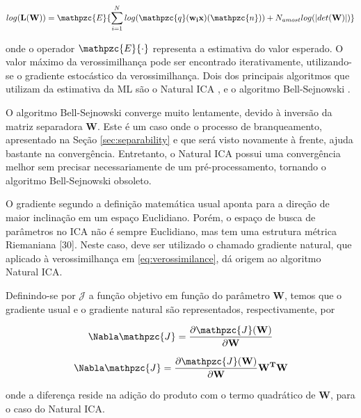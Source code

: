         \begin{equation}
        \label{eq:logverossimilance}
        log(\mathbf{L(W)}) = \mathpzc{E}\{\sum_{i=1}^Nlog(\mathpzc{q}(\mathbf{w_ix})(\mathpzc{n})) + N_{amost}log(|det(\mathbf{W})|)\}
    \end{equation}
    
    onde o operador $\mathpzc{E}\{\cdot\}$ representa a estimativa do valor esperado. O valor máximo da verossimilhança pode ser encontrado iterativamente, utilizando-se o gradiente estocástico da verossimilhança. Dois dos principais algoritmos que utilizam da estimativa da ML são o Natural ICA \cite{NaturalICA}, e o algoritmo Bell-Sejnowski \cite{Bell}.
    
    O algoritmo Bell-Sejnowski converge muito lentamente, devido à inversão da matriz separadora $\mathbf{W}$. Este é um caso onde o processo de branqueamento, apresentado na Seção \ref{sec:separability} e que será visto novamente à frente, ajuda bastante na convergência. Entretanto, o Natural ICA possui uma convergência melhor sem precisar necessariamente de um pré-processamento, tornando o algoritmo Bell-Sejnowski obsoleto.
    
    O gradiente segundo a definição matemática usual aponta para a direção de maior inclinação em um espaço Euclidiano. Porém, o espaço de busca de parâmetros no ICA não é sempre Euclidiano, mas tem uma estrutura métrica Riemaniana [30]. Neste caso, deve ser utilizado o chamado gradiente natural, que aplicado à verossimilhança em \ref{eq:verossimilance}, dá origem ao algoritmo Natural ICA.
    
    Definindo-se por $\mathcal{J}$ a função objetivo em função do parâmetro $\mathbf{W}$, temos que o gradiente usual e o gradiente natural são representados, respectivamente, por
    
    \begin{equation}
        \label{eq:gradiente}
        \Nabla\mathpzc{J} = \frac{\partial \mathpzc{J}(\mathbf{W})}{\partial \mathbf{W}}
    \end{equation}
    
        \begin{equation}
        \label{eq:naturalgradiente}
        \Nabla\mathpzc{J} = \frac{\partial \mathpzc{J}(\mathbf{W})}{\partial \mathbf{W}}\mathbf{W^T}\mathbf{W}
    \end{equation}
    
    onde a diferença reside na adição do produto com o termo quadrático de $\mathbf{W}$, para o caso do Natural ICA.